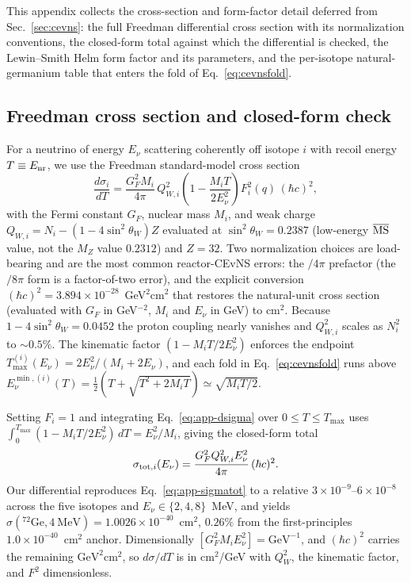 This appendix collects the cross-section and form-factor detail deferred from Sec.~\ref{sec:cevns}: the full Freedman differential cross section with its normalization conventions, the closed-form total against which the differential is checked, the Lewin--Smith Helm form factor and its parameters, and the per-isotope natural-germanium table that enters the fold of Eq.~\eqref{eq:cevnsfold}.

\subsection{Freedman cross section and closed-form check}

For a neutrino of energy $E_\nu$ scattering coherently off isotope $i$ with recoil energy $T\equiv E_{\rm nr}$, we use the Freedman standard-model cross section~\cite{freedman1974,drukier1984}
\begin{equation}
\frac{d\sigma_i}{dT} = \frac{G_F^2 M_i}{4\pi}\, Q_{W,i}^2
\left(1 - \frac{M_i T}{2 E_\nu^2}\right) F_i^2(q)\,(\hbar c)^2 ,
\label{eq:app-dsigma}
\end{equation}
with the Fermi constant $G_F$, nuclear mass $M_i$, and weak charge $Q_{W,i}=N_i-(1-4\sin^2\theta_W)Z$ evaluated at $\sin^2\theta_W=0.2387$ (low-energy $\overline{\rm MS}$ value, not the $M_Z$ value $0.2312$) and $Z=32$. Two normalization choices are load-bearing and are the most common reactor-CEvNS errors: the $/4\pi$ prefactor (the $/8\pi$ form is a factor-of-two error), and the explicit conversion $(\hbar c)^2=3.894\times10^{-28}$~GeV$^2$cm$^2$ that restores the natural-unit cross section (evaluated with $G_F$ in GeV$^{-2}$, $M_i$ and $E_\nu$ in GeV) to cm$^2$. Because $1-4\sin^2\theta_W=0.0452$ the proton coupling nearly vanishes and $Q_{W,i}^2$ scales as $N_i^2$ to $\sim0.5\%$. The kinematic factor $(1-M_iT/2E_\nu^2)$ enforces the endpoint $T_{\max}^{(i)}(E_\nu)=2E_\nu^2/(M_i+2E_\nu)$, and each fold in Eq.~\eqref{eq:cevnsfold} runs above $E_\nu^{\min,(i)}(T)=\tfrac12\!\left(T+\sqrt{T^2+2M_iT}\right)\simeq\sqrt{M_iT/2}$.

Setting $F_i=1$ and integrating Eq.~\eqref{eq:app-dsigma} over $0\le T\le T_{\max}$ uses $\int_0^{T_{\max}}(1-M_iT/2E_\nu^2)\,dT=E_\nu^2/M_i$, giving the closed-form total
\begin{equation}
\sigma_{{\rm tot},i}(E_\nu) = \frac{G_F^2 Q_{W,i}^2 E_\nu^2}{4\pi}\,(\hbar c)^2 .
\label{eq:app-sigmatot}
\end{equation}
Our differential reproduces Eq.~\eqref{eq:app-sigmatot} to a relative $3\times10^{-9}$--$6\times10^{-8}$ across the five isotopes and $E_\nu\in\{2,4,8\}$~MeV, and yields $\sigma({}^{72}\mathrm{Ge},4~\mathrm{MeV})=1.0026\times10^{-40}$~cm$^2$, $0.26\%$ from the first-principles $1.0\times10^{-40}$~cm$^2$ anchor. Dimensionally $[G_F^2 M_i E_\nu^2]=\mathrm{GeV}^{-1}$, and $(\hbar c)^2$ carries the remaining $\mathrm{GeV}^2\mathrm{cm}^2$, so $d\sigma/dT$ is in cm$^2$/GeV with $Q_W^2$, the kinematic factor, and $F^2$ dimensionless.

